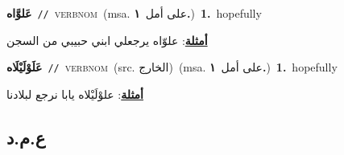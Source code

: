 \documentclass[10pt,a4paper,twoside]{article} %
\begin{document}
\begin{multicols}{2}
{\setlength\topsep{0pt}\textbf{\foreignlanguage{arabic}{عَلوَّاه}}\ {\color{gray}\texttt{//}\color{black}}\ \textsc{verb\textunderscore nom}\ \color{gray}(msa. \foreignlanguage{arabic}{على أمل}~\foreignlanguage{arabic}{\textbf{١.}})\color{black}\ \textbf{1.}~hopefully\  \begin{flushright}\color{gray}\foreignlanguage{arabic}{\textbf{\underline{\foreignlanguage{arabic}{أمثلة}}}: علوّاه يرجعلي ابني حبيبي من السجن}\end{flushright}\color{black}} \vspace{2mm}

{\setlength\topsep{0pt}\textbf{\foreignlanguage{arabic}{عَلَوْلَيْلَاه}}\ {\color{gray}\texttt{//}\color{black}}\ \textsc{verb\textunderscore nom}\ (src. \color{gray}\foreignlanguage{arabic}{الخارج}\color{black})\ \color{gray}(msa. \foreignlanguage{arabic}{على أمل}~\foreignlanguage{arabic}{\textbf{١.}})\color{black}\ \textbf{1.}~hopefully\  \begin{flushright}\color{gray}\foreignlanguage{arabic}{\textbf{\underline{\foreignlanguage{arabic}{أمثلة}}}: علوْلَيْلاه يابا نرجع لبلادنا}\end{flushright}\color{black}} \vspace{2mm}

\vspace{-3mm}
\subsection*{\color{blue}\foreignlanguage{arabic}{ع.م.د}\color{blue}{}} 


\end{multicols}
\end{document}
